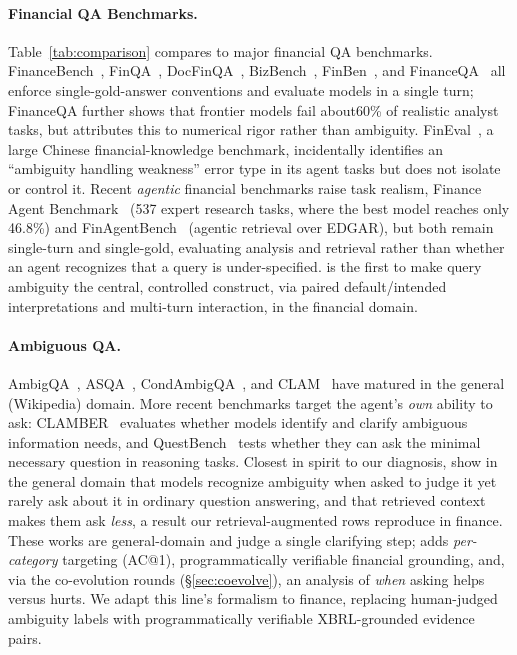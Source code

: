 \paragraph{Financial QA Benchmarks.}
Table~\ref{tab:comparison} compares \fininteract to major financial QA
benchmarks.
FinanceBench~\citep{islam2023financebench},
FinQA~\citep{chen2021finqa},
DocFinQA~\citep{reddy2024docfinqa},
BizBench~\citep{krumdick2024bizbench},
FinBen~\citep{xie2024finben}, and
FinanceQA~\citep{mateega2025financeqa}
all enforce single-gold-answer conventions and evaluate models in a single turn;
FinanceQA further shows that frontier models fail about60\% of realistic
analyst tasks, but attributes this to numerical rigor rather than ambiguity.
FinEval~\citep{guo2023fineval}, a large Chinese financial-knowledge benchmark,
incidentally identifies an ``ambiguity handling weakness'' error type in its
agent tasks but does not isolate or control it. Recent \emph{agentic} financial
benchmarks raise task realism, Finance Agent Benchmark~\citep{bigeard2025financeagent}
(537 expert research tasks, where the best model reaches only 46.8\%) and
FinAgentBench~\citep{choi2025finagentbench} (agentic retrieval over EDGAR), but both
remain single-turn and single-gold, evaluating analysis and retrieval rather than
whether an agent recognizes that a query is under-specified. \fininteract is the
first to make query ambiguity the central, controlled construct, via paired
default/intended interpretations and multi-turn interaction, in the financial
domain.



\paragraph{Ambiguous QA.}
AmbigQA~\citep{min2020ambigqa},
ASQA~\citep{stelmakh2022asqa},
CondAmbigQA~\citep{li2025condambigqa}, and
CLAM~\citep{kuhn2022clam}
have matured in the general (Wikipedia) domain.
More recent benchmarks target the agent's \emph{own} ability to ask:
CLAMBER~\citep{zhang2024clamber} evaluates whether models identify and clarify
ambiguous information needs, and QuestBench~\citep{li2025questbench} tests whether
they can ask the minimal necessary question in reasoning tasks. Closest in spirit to our
diagnosis, \citet{su2026knowing} show in the general domain that models recognize ambiguity when
asked to judge it yet rarely ask about it in ordinary question answering, and that retrieved
context makes them ask \emph{less}, a result our retrieval-augmented rows reproduce in finance.
These works are general-domain and judge a single clarifying step; \fininteract adds \emph{per-category}
targeting (AC@1), programmatically verifiable financial grounding, and, via the
co-evolution rounds (\S\ref{sec:coevolve}), an analysis of \emph{when} asking helps
versus hurts. We adapt this line's formalism to finance, replacing human-judged
ambiguity labels with programmatically verifiable XBRL-grounded evidence pairs.

